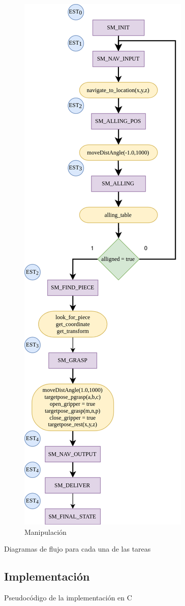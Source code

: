     \begin{figure}[ht]
        \centering
        \includegraphics[scale= 0.4]{Figures/Manipulacion_CT.png}
            \caption{Manipulación}
            \label{fig:ASM_Manipulación}
        \end{figure}
Diagramas de flujo para cada una de las tareas
\subsection{Implementación}
Pseudocódigo de la implementación en C